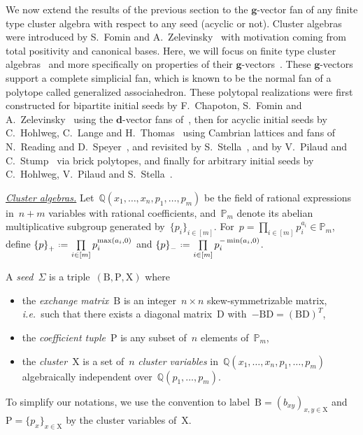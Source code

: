 \documentclass{amsart}
\theoremstyle{definition}
\newcommand{\Q}{\mathbb{Q}} %
\renewcommand{\b}[1]{{\boldsymbol{#1}}} %
\newcommand{\eqdef}{\mbox{\,\raisebox{0.2ex}{\scriptsize\ensuremath{\mathrm:}}\ensuremath{=}\,}} %
\newcommand{\ie}{\textit{i.e.}~} %
\newcommand{\darkblue}{\color{darkblue}} %
\newcommand{\defn}[1]{\textsl{\darkblue #1}} %
\newcommand{\para}[1]{\medskip\noindent\uline{\textit{#1.}}} %
\newcommand{\Trop}[1]{\mathbb{P}_{#1}} %
\newcommand{\positiveExponents}[1]{\left\{#1\right\}_+} %
\newcommand{\negativeExponents}[1]{\left\{#1\right\}_-} %
\newcommand{\seed}{\Sigma} %
\newcommand{\cluster}{\mathrm{X}} %
\newcommand{\coefficients}{\mathrm{P}} %
\newcommand{\B}{\mathrm{B}} %
\newcommand{\D}{\mathrm{D}} %
\begin{document}
We now extend the results of the previous section to the $\b{g}$-vector fan of any finite type cluster algebra with respect to any seed (acyclic or not).
Cluster algebras were introduced by S.~Fomin and A.~Zelevinsky~\cite{FominZelevinsky-ClusterAlgebrasI} with motivation coming from total positivity and canonical bases.
Here, we will focus on finite type cluster algebras~\cite{FominZelevinsky-ClusterAlgebrasII} and more specifically on properties of their $\b{g}$-vectors~\cite{FominZelevinsky-ClusterAlgebrasIV}.
These $\b{g}$-vectors support a complete simplicial fan, which is known to be the normal fan of a polytope called generalized associahedron. These polytopal realizations were first constructed for bipartite initial seeds by F.~Chapoton, S.~Fomin and A.~Zelevinsky~\cite{ChapotonFominZelevinsky} using the $\b{d}$-vector fans of~\cite{FominZelevinsky-YSystems}, then for acyclic initial seeds by C.~Hohlweg, C.~Lange and H.~Thomas~\cite{HohlwegLangeThomas} using Cambrian lattices and fans of N.~Reading and D.~Speyer~\cite{Reading-CambrianLattices, ReadingSpeyer}, and revisited by S.~Stella~\cite{Stella}, and by V.~Pilaud and C.~Stump~\cite{PilaudStump-brickPolytope} via brick polytopes, and finally for arbitrary initial seeds by C.~Hohlweg, V.~Pilaud and S.~Stella~\cite{HohlwegPilaudStella}.

\para{Cluster algebras}
%
Let~$\Q(x_1, \dots, x_n, p_1, \dots, p_m)$ be the field of rational expressions in~$n+m$ variables with rational coefficients, and~$\Trop{m}$ denote its abelian multiplicative subgroup generated by~$\{p_i\}_{i \in [m]}$.
For~$p = \prod\limits_{i \in [m]} p_i^{a_i} \in \Trop{m}$, define
\(
\positiveExponents{p} \eqdef \prod\limits_{i \in [m]} p_i^{\max(a_i,0)}
\)
and
\(
\negativeExponents{p} \eqdef \prod\limits_{i \in [m]} p_i^{-\min(a_i,0)}
\).

\medskip
A \defn{seed}~$\seed$ is a triple~$(\B, \coefficients, \cluster)$ where
\begin{itemize}
\item the \defn{exchange matrix}~$\B$ is an integer~$n \times n$ skew-symmetrizable matrix, \ie such that there exists a diagonal matrix~$\D$ with~$-\B\D = (\B\D)^T$,
\item the \defn{coefficient tuple}~$\coefficients$ is any subset of~$n$ elements of~$\Trop{m}$,
\item the \defn{cluster}~$\cluster$ is a set of~$n$ \defn{cluster variables} in~$\Q(x_1, \dots, x_n, p_1, \dots, p_m)$ algebraically independent over~$\Q(p_1, \dots, p_m)$.
\end{itemize}
To simplify our notations, we use the convention to label~$\B = (b_{xy})_{x,y \in \cluster}$ and~$\coefficients = \{p_x\}_{x \in \cluster}$ by the cluster variables of~$\cluster$.
\end{document}
